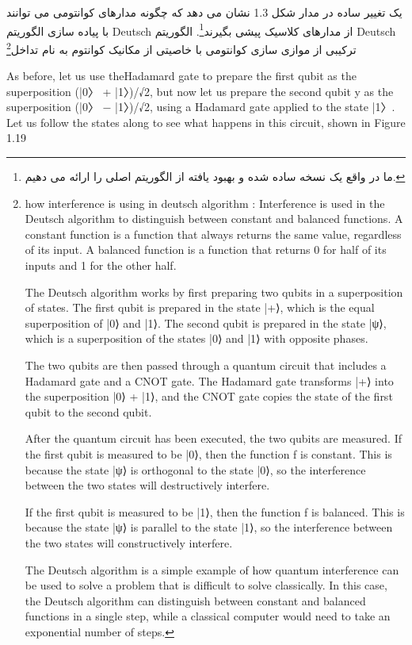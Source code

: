 \documentclass{book}
\begin{document}
 
یک تغییر ساده در مدار شکل 1.3 نشان می دهد که چگونه مدارهای کوانتومی می توانند با پیاده سازی الگوریتم Deutsch از مدارهای کلاسیک پیشی بگیرند\footnote{ما در واقع یک نسخه ساده شده و بهبود یافته از الگوریتم اصلی را ارائه می دهیم.}. الگوریتم Deutsch ترکیبی از موازی سازی کوانتومی با خاصیتی از مکانیک کوانتوم به نام تداخل\footnote{how interference is using in deutsch algorithm : Interference is used in the Deutsch algorithm to distinguish between constant and balanced functions. A constant function is a function that always returns the same value, regardless of its input. A balanced function is a function that returns 0 for half of its inputs and 1 for the other half.
	
	The Deutsch algorithm works by first preparing two qubits in a superposition of states. The first qubit is prepared in the state |+⟩, which is the equal superposition of |0⟩ and |1⟩. The second qubit is prepared in the state |ψ⟩, which is a superposition of the states |0⟩ and |1⟩ with opposite phases.
	
	The two qubits are then passed through a quantum circuit that includes a Hadamard gate and a CNOT gate. The Hadamard gate transforms |+⟩ into the superposition |0⟩ + |1⟩, and the CNOT gate copies the state of the first qubit to the second qubit.
	
	After the quantum circuit has been executed, the two qubits are measured. If the first qubit is measured to be |0⟩, then the function f is constant. This is because the state |ψ⟩ is orthogonal to the state |0⟩, so the interference between the two states will destructively interfere.
	
	If the first qubit is measured to be |1⟩, then the function f is balanced. This is because the state |ψ⟩ is parallel to the state |1⟩, so the interference between the two states will constructively interfere.
	
	The Deutsch algorithm is a simple example of how quantum interference can be used to solve a problem that is difficult to solve classically. In this case, the Deutsch algorithm can distinguish between constant and balanced functions in a single step, while a classical computer would need to take an exponential number of steps.} 



As before, let us use theHadamard gate to prepare the first qubit as the superposition (|0〉 + |1〉)/√2, but now let us prepare the second qubit y as the superposition (|0〉 − |1〉)/√2, using a Hadamard gate applied to the state |1〉. Let us follow the states along to see what happens in this circuit, shown in Figure 1.19
\end{document}

